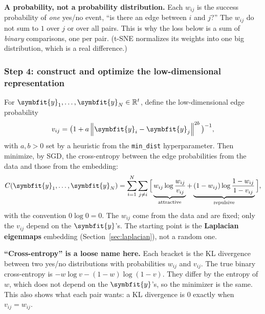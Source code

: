 \documentclass[11pt]{article}
\newcommand{\bm}[1]{\symbfit{#1}}
\newcommand{\R}{\mathbb{R}}
\newcommand{\norm}[1]{\left\lVert #1\right\rVert}
\begin{document}
\begin{careful}
\textbf{A probability, not a probability distribution.} Each $w_{ij}$ is the success probability of \emph{one} yes/no event, ``is there an edge between $i$ and $j$?'' The $w_{ij}$ do not sum to $1$ over $j$ or over all pairs.
This is why the loss below is a sum of \emph{binary} comparisons, one per pair. (t-SNE normalizes its weights into one big distribution, which is a real difference.)
\end{careful}

\subsubsection*{Step 4: construct and optimize the low-dimensional representation}
For $\bm y_1,\dots,\bm y_N\in\R^t$, define the low-dimensional edge probability
\[
v_{ij}=\big(1+a\norm{\bm y_i-\bm y_j}^{2b}\big)^{-1},
\]
with $a,b>0$ set by a heuristic from the \texttt{min\_dist} hyperparameter. Then minimize, by SGD, the cross-entropy between the edge probabilities from the data and those from the embedding:
\[
C(\bm y_1,\dots,\bm y_N)=\sum_{i=1}^N\sum_{j\ne i}\Big[\underbrace{w_{ij}\log\frac{w_{ij}}{v_{ij}}}_{\text{attractive}}+\underbrace{(1-w_{ij})\log\frac{1-w_{ij}}{1-v_{ij}}}_{\text{repulsive}}\Big],
\]
with the convention $0\log0=0$. The $w_{ij}$ come from the data and are fixed; only the $v_{ij}$ depend on the $\bm y$'s.
The starting point is the \textbf{Laplacian eigenmaps} embedding (Section~\ref{sec:laplacian}), not a random one.

\begin{careful}
\textbf{``Cross-entropy'' is a loose name here.} Each bracket is the KL divergence between two yes/no distributions with probabilities $w_{ij}$ and $v_{ij}$. The true binary cross-entropy is $-w\log v-(1-w)\log(1-v)$.
They differ by the entropy of $w$, which does not depend on the $\bm y$'s, so the minimizer is the same. This also shows what each pair wants: a KL divergence is $0$ exactly when $v_{ij}=w_{ij}$.
\end{careful}
\end{document}

